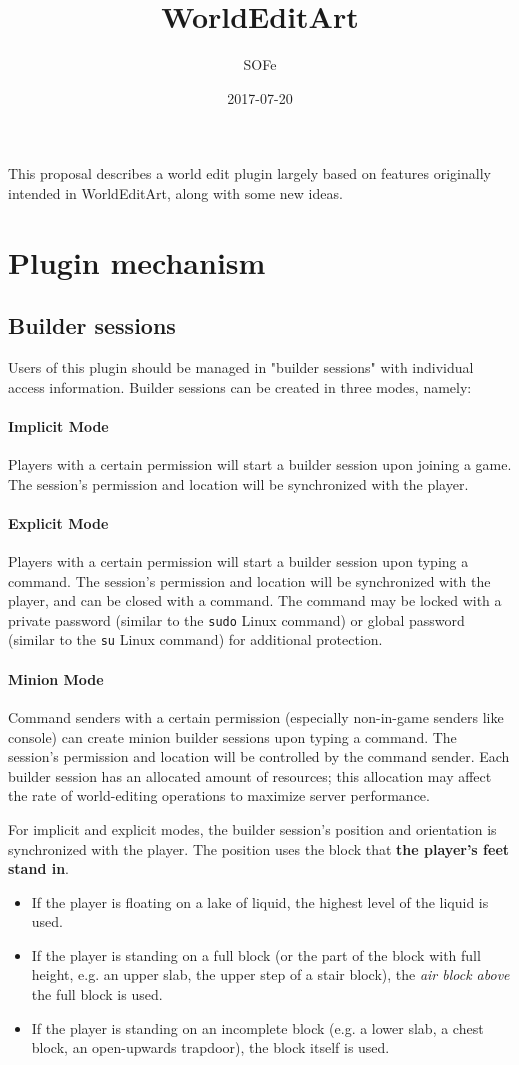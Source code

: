 \documentclass{article}
\title{WorldEditArt}
\date{2017-07-20}
\author{SOFe}
\begin{document}
	\maketitle
	This proposal describes a world edit plugin largely based on features originally intended in WorldEditArt, along with
	some new ideas.
	\section{Plugin mechanism}
		\subsection{Builder sessions}
			Users of this plugin should be managed in "builder sessions" with individual access information. Builder
			sessions can be created in three modes, namely:
			\paragraph{Implicit Mode}
				Players with a certain permission will start a builder session upon joining a game. The session's permission
				and location will be synchronized with the player.
			\paragraph{Explicit Mode}
				Players with a certain permission will start a builder session upon typing a command. The session's
				permission and location will be synchronized with the player, and can be closed with a command. The command
				may be locked with a private password (similar to the \texttt{sudo} Linux command) or global password
				(similar to the \texttt{su} Linux command) for additional protection.
			\paragraph{Minion Mode}
				Command senders with a certain permission (especially non-in-game senders like console) can create minion
				builder sessions upon typing a command. The session's permission and location will be controlled by the
				command sender.
			Each builder session has an allocated amount of resources; this allocation may affect the rate of world-editing
			operations to maximize server performance.

			For implicit and explicit modes, the builder session's position and orientation is synchronized with the
			player. The position uses the block that \textbf{the player's feet stand in}.
			\begin{itemize}
				\item If the player is floating on a lake of liquid, the highest level of the liquid is used.
				\item If the player is standing on a full block (or the part of the block with full height, e.g. an upper slab, the upper step of a stair block), the \emph{air block above} the full block is used.
				\item If the player is standing on an incomplete block (e.g. a lower slab, a chest block, an open-upwards trapdoor), the block itself is used.
			\end{itemize}
\end{document}

